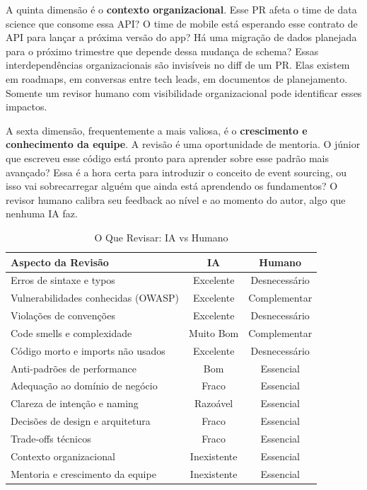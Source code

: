 A quinta dimensão é o \textbf{contexto organizacional}. Esse PR afeta o time de data
science que consome essa API? O time de mobile está esperando esse contrato de API
para lançar a próxima versão do app? Há uma migração de dados planejada para o
próximo trimestre que depende dessa mudança de schema? Essas interdependências
organizacionais são invisíveis no diff de um PR. Elas existem em roadmaps, em
conversas entre tech leads, em documentos de planejamento. Somente um revisor humano
com visibilidade organizacional pode identificar esses impactos.

A sexta dimensão, frequentemente a mais valiosa, é o \textbf{crescimento e
conhecimento da equipe}. A revisão é uma oportunidade de mentoria. O júnior que
escreveu esse código está pronto para aprender sobre esse padrão mais avançado? Essa
é a hora certa para introduzir o conceito de event sourcing, ou isso vai
sobrecarregar alguém que ainda está aprendendo os fundamentos? O revisor humano
calibra seu feedback ao nível e ao momento do autor, algo que nenhuma IA faz.

\begin{table}[htbp]
\centering
\caption{O Que Revisar: IA vs Humano}
\begin{tabular}{p{5.5cm}cc}
\toprule
\textbf{Aspecto da Revisão} & \textbf{IA} & \textbf{Humano} \\
\midrule
Erros de sintaxe e typos            & Excelente & Desnecessário \\
Vulnerabilidades conhecidas (OWASP) & Excelente & Complementar \\
Violações de convenções             & Excelente & Desnecessário \\
Code smells e complexidade          & Muito Bom & Complementar \\
Código morto e imports não usados   & Excelente & Desnecessário \\
Anti-padrões de performance         & Bom       & Essencial    \\
Adequação ao domínio de negócio     & Fraco     & Essencial    \\
Clareza de intenção e naming        & Razoável  & Essencial    \\
Decisões de design e arquitetura    & Fraco     & Essencial    \\
Trade-offs técnicos                 & Fraco     & Essencial    \\
Contexto organizacional             & Inexistente & Essencial  \\
Mentoria e crescimento da equipe    & Inexistente & Essencial  \\
\bottomrule
\end{tabular}
\end{table}

